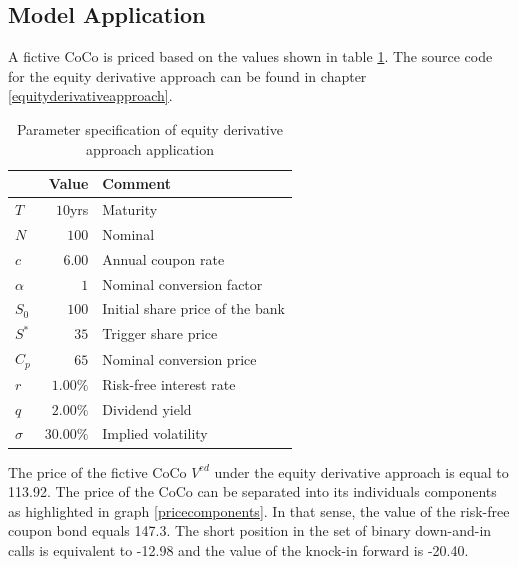 \subsection{Model Application}

A fictive CoCo is priced based on the values shown in table \ref{equityexample}. The source code for the equity derivative approach can be found in chapter \ref{equityderivativeapproach}. 

\begin{table}[H]
	\setlength{\extrarowheight}{2.5pt}
	\centering
	\begin{tabular}{lrl}
		\toprule
			 & \textbf{Value} & \textbf{Comment} \\
		\midrule
			$T$ & $10$yrs & Maturity \\
			$N$ & $100$ & Nominal \\			
			$c$ & $6.00$ & Annual coupon rate \\
			$\alpha$ & $1$ & Nominal conversion factor \\ 
			$S_0$ & $100$ & Initial share price of the bank \\
			$S^*$ & $35$ & Trigger share price \\
			$C_p$ & $65$ & Nominal conversion price \\
			$r$ & $1.00 \%$ & Risk-free interest rate\\
			$q$ & $2.00\%$ & Dividend yield \\
			$\sigma$& $30.00 \%$ & Implied volatility \\
		\bottomrule
	\end{tabular}
	\caption[Parameter specification of equity derivative approach application]{Parameter specification of equity derivative approach application \citep{alvemar2012modelling}}
	\label{equityexample}
\end{table}

The price of the fictive CoCo $V^{ed}$ under the equity derivative approach is equal to 113.92. The price of the CoCo can be separated into its individuals components as highlighted in graph \ref{pricecomponents}. In that sense, the value of the risk-free coupon bond equals 147.3. The short position in the set of binary down-and-in calls is equivalent to -12.98 and the value of the knock-in forward is -20.40.

